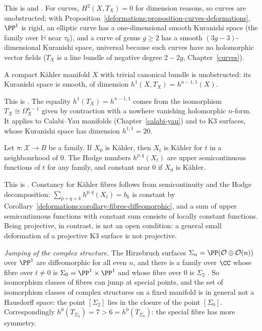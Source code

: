 This is \cite[Chapter 6]{huybrechts-complex} and \cite[Chapter 9]{voisin-hodge-1}. For curves, $H^2(X, T_X) = 0$ for dimension reasons, so curves are unobstructed; with
Proposition~\ref{deformations:proposition-curves-deformations}, $\PP^1$ is rigid, an elliptic curve has a one-dimensional smooth Kuranishi space (the family over $\mathbb{H}$ near $\tau_0$), and a curve of genus $g \geq 2$
has a smooth $(3g - 3)$-dimensional Kuranishi space, universal because such curves have no holomorphic vector fields ($T_X$ is a line bundle of negative degree $2 - 2g$, Chapter~\ref{curves}).

\begin{theorem}\label{deformations:theorem-btt}
A compact K\"ahler manifold $X$ with trivial canonical bundle is unobstructed: its Kuranishi space is smooth, of dimension $h^1(X, T_X) = h^{n-1,1}(X)$.
\end{theorem}

This is \cite[Chapter 6]{huybrechts-complex}. The equality $h^1(T_X) = h^{n-1,1}$ comes from the isomorphism $T_X \cong \Omega^{n-1}_X$ given by contraction with a nowhere vanishing holomorphic $n$-form. It applies
to Calabi--Yau manifolds (Chapter~\ref{calabi-yau}) and to K3 surfaces, whose Kuranishi space has dimension $h^{1,1} = 20$.

\begin{theorem}\label{deformations:theorem-kahler-stability}
Let $\pi \colon \mathcal{X} \to B$ be a family. If $X_0$ is K\"ahler, then $X_t$ is K\"ahler for $t$ in a neighbourhood of $0$. The Hodge numbers $h^{p,q}(X_t)$ are upper semicontinuous functions of $t$ for any
family, and constant near $0$ if $X_0$ is K\"ahler.
\end{theorem}

This is \cite[Chapter 9]{voisin-hodge-1}. Constancy for K\"ahler fibres follows from semicontinuity and the Hodge decomposition: $\sum_{p+q=k}h^{p,q}(X_t) = b_k$ is constant by
Corollary~\ref{deformations:corollary-fibres-diffeomorphic}, and a sum of upper semicontinuous functions with constant sum consists of locally constant functions. Being projective, in contrast, is not an open
condition: a general small deformation of a projective K3 surface is not projective.

\begin{remark}\label{deformations:remark-jumping}
\emph{Jumping of the complex structure.} The Hirzebruch surfaces $\Sigma_n = \PP(\mathcal{O} \oplus \mathcal{O}(n))$ over $\PP^1$ are diffeomorphic for all even $n$, and there is a family over $\CC$ whose fibre over $t \neq 0$ is
$\Sigma_0 = \PP^1 \times \PP^1$ and whose fibre over $0$ is $\Sigma_2$ \cite{kodaira-deformations}. So isomorphism classes of fibres can jump at special points, and the set of isomorphism classes of complex
structures on a fixed manifold is in general not a Hausdorff space: the point $[\Sigma_2]$ lies in the closure of the point $[\Sigma_0]$. Correspondingly $h^0(T_{\Sigma_2}) = 7 > 6 = h^0(T_{\Sigma_0})$: the
special fibre has more symmetry.
\end{remark}

